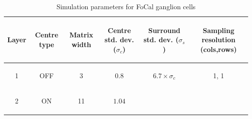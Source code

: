 \begin{table}[htb]
	\caption{Simulation parameters for FoCal ganglion cells}
	\begin{center}
		
		
		
		\begin{tabular}{c c c c c c}
			\begin{mycellS}{0.8cm}\centering Layer \end{mycellS}& 
			\begin{mycellS}{1.1cm}\centering Centre type\end{mycellS}& 
			\begin{mycellS}{1.1cm}\centering Matrix width \end{mycellS}&  
			\begin{mycellS}{1.6cm}\centering Centre std. dev. ($\sigma_c$)\end{mycellS} & 
			\begin{mycellS}{1.6cm}\centering Surround std. dev. ($\sigma_s$)\end{mycellS} & 
			\begin{mycellS}{1.3cm}\centering Sampling resolution (cols,rows)\end{mycellS} \\
			\hline
			\begin{mycell}{0.8cm} 1  \end{mycell} &
			\begin{mycell}{1.1cm} \textsc{OFF} \end{mycell}& 
			\begin{mycell}{1.1cm} 3 \end{mycell}& 
			\begin{mycell}{1.6cm}$0.8$ \end{mycell}& 
      \begin{mycell}{1.6cm}$6.7 \times \sigma_c$ \end{mycell}&  
      \begin{mycell}{1.6cm}1, 1 \end{mycell}\\
			\begin{mycell}{0.8cm} 2 \end{mycell} & 
			\begin{mycell}{1.1cm} \textsc{ON} \end{mycell} & 
			\begin{mycell}{1.1cm} 11 \end{mycell}& 
			\begin{mycell}{1.6cm}$1.04$ \end{mycell}& 

\end{tabular}
\end{center}
\end{table}
